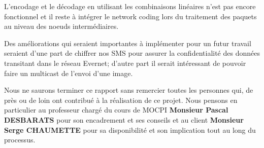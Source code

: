 L'encodage et le décodage en utilisant les combinaisons linéaires n'est pas encore fonctionnel et il reste à intégrer le network coding lors du traitement des paquets au niveau des noeuds intermédiaires.
    
    
    \vspace{0.2cm}
    Des améliorations qui seraient importantes à implémenter pour un futur travail seraient d'une part de chiffrer nos SMS pour assurer la confidentialité des données transitant dans le réseau Evernet; d'autre part il serait intéressant de pouvoir faire un multicast de l'envoi d'une image.
    
    \vspace{0.2cm}
    Nous ne saurons terminer ce rapport sans remercier toutes les personnes qui, de près ou de loin ont contribué à la réalisation de ce projet. Nous pensons en particulier au professeur chargé du cours de MOCPI \textbf{Monsieur Pascal DESBARATS} pour son encadrement et ses conseils et au client \textbf{Monsieur Serge CHAUMETTE} pour sa disponibilité et son implication tout au long du processus.

